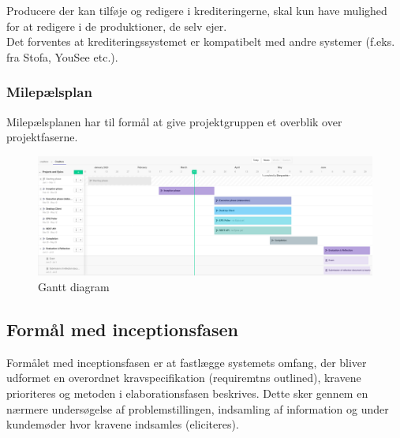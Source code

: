 \noindent
Producere der kan tilføje og redigere i krediteringerne, skal kun have mulighed for at redigere i de produktioner, de selv ejer.\\
Det forventes at krediteringssystemet er kompatibelt med andre systemer (f.eks. fra Stofa, YouSee etc.).

\subsubsection{Milepælsplan}
Milepælsplanen har til formål at give projektgruppen et overblik over projektfaserne.\\


\begin{landscape}
\begin{figure}
    \centering

\includegraphics[scale=0.35]{figures/gantt1.png}
\caption{Gantt diagram}
\label{fig:gantt}
\end{figure}{}
\end{landscape}


\subsection{Formål med inceptionsfasen}
Formålet med inceptionsfasen er at fastlægge systemets omfang, der bliver udformet en overordnet kravspecifikation (requiremtns outlined), kravene prioriteres og metoden i elaborationsfasen beskrives. Dette sker gennem en nærmere undersøgelse af problemstillingen, indsamling af information og under kundemøder hvor kravene indsamles (eliciteres).\\

